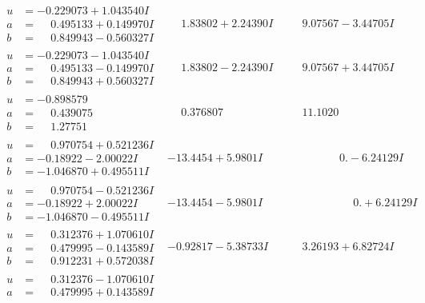 \documentclass[1p]{elsarticle_modified}
\theoremstyle{definition}
\begin{document}
$$\begin{array}{c|c|c}
\begin{aligned}
u &= -0.229073 + 1.043540 I \\
a &= \phantom{-}0.495133 + 0.149970 I \\
b &= \phantom{-}0.849943 - 0.560327 I\end{aligned}
 & \phantom{-}1.83802 + 2.24390 I & \phantom{-}9.07567 - 3.44705 I \\ \hline\begin{aligned}
u &= -0.229073 - 1.043540 I \\
a &= \phantom{-}0.495133 - 0.149970 I \\
b &= \phantom{-}0.849943 + 0.560327 I\end{aligned}
 & \phantom{-}1.83802 - 2.24390 I & \phantom{-}9.07567 + 3.44705 I \\ \hline\begin{aligned}
u &= -0.898579\phantom{ +0.000000I} \\
a &= \phantom{-}0.439075\phantom{ +0.000000I} \\
b &= \phantom{-}1.27751\phantom{ +0.000000I}\end{aligned}
 & \phantom{-}0.376807\phantom{ +0.000000I} & \phantom{-}11.1020\phantom{ +0.000000I} \\ \hline\begin{aligned}
u &= \phantom{-}0.970754 + 0.521236 I \\
a &= -0.18922 - 2.00022 I \\
b &= -1.046870 + 0.495511 I\end{aligned}
 & -13.4454 + 5.9801 I & \phantom{-0.000000 } 0. - 6.24129 I \\ \hline\begin{aligned}
u &= \phantom{-}0.970754 - 0.521236 I \\
a &= -0.18922 + 2.00022 I \\
b &= -1.046870 - 0.495511 I\end{aligned}
 & -13.4454 - 5.9801 I & \phantom{-0.000000 -}0. + 6.24129 I \\ \hline\begin{aligned}
u &= \phantom{-}0.312376 + 1.070610 I \\
a &= \phantom{-}0.479995 - 0.143589 I \\
b &= \phantom{-}0.912231 + 0.572038 I\end{aligned}
 & -0.92817 - 5.38733 I & \phantom{-}3.26193 + 6.82724 I \\ \hline\begin{aligned}
u &= \phantom{-}0.312376 - 1.070610 I \\
a &= \phantom{-}0.479995 + 0.143589 I \\

\end{aligned}
\end{array}$$
\end{document}
